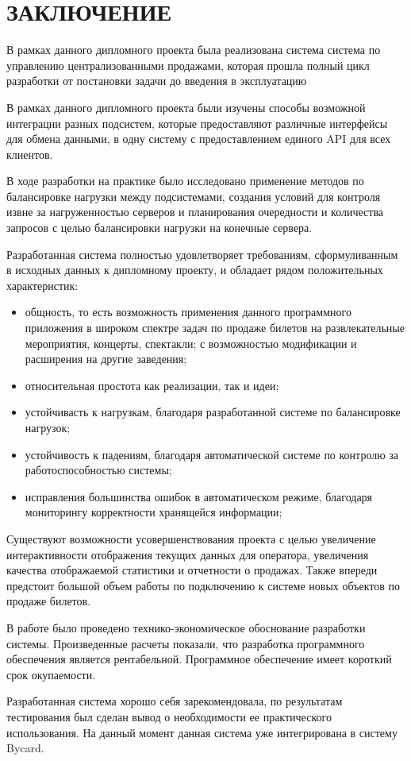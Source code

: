 \section*{ЗАКЛЮЧЕНИЕ}

В рамках данного дипломного проекта была реализована система система по управлению централизованными продажами, которая прошла полный цикл разработки от постановки задачи до введения в эксплуатацию


В рамках данного дипломного проекта были изучены способы возможной интеграции разных подсистем, которые предоставляют различные интерфейсы для обмена данными, в одну систему с предоставлением единого API для всех клиентов.

В ходе разработки на практике было исследовано применение методов по балансировке нагрузки между подсистемами, создания условий для контроля извне за нагруженностью серверов и планирования очередности и количества запросов с целью балансировки нагрузки на конечные сервера.

Разработанная система полностью удовлетворяет требованиям, сформуливанным в исходных данных к дипломному проекту, и обладает рядом положительных характеристик:
\begin{itemize}
  \item общность, то есть возможность применения данного программного приложения в широком спектре задач по продаже билетов на развлекательные мероприятия, концерты, спектакли; с возможностью модификации и расширения на другие заведения;
  \item относительная простота как реализации, так и идеи;
  \item устойчивасть к нагрузкам, благодаря разработанной системе по балансировке нагрузок;
  \item устойчивость к падениям, благодаря автоматической системе по контролю за работоспособностью системы;
  \item исправления большинства ошибок в автоматическом режиме, благодаря мониторингу корректности хранящейся информации;
\end{itemize}

Существуют возможности усовершенствования проекта с целью увеличение интерактивности отображения текущих данных для оператора, увеличения качества отображаемой статистики и  отчетности о продажах. Также впереди предстоит большой объем работы по подключению к системе новых объектов по продаже билетов.

В работе было проведено технико-экономическое обоснование разработки системы. Произведенные расчеты показали, что разработка программного обеспечения является рентабельной. Программное обеспечение имеет короткий срок окупаемости.

Разработанная система хорошо себя зарекомендовала, по результатам тестирования был сделан вывод о необходимости ее практического использования. На данный момент данная система уже интегрирована в систему Bycard.

\newpage
